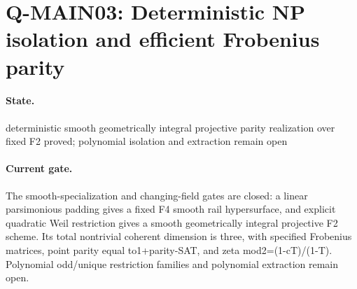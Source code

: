 \section{Q-MAIN03: Deterministic NP isolation and efficient Frobenius parity}
\paragraph{State.} deterministic smooth geometrically integral projective parity realization over fixed F2 proved; polynomial isolation and extraction remain open
\paragraph{Current gate.} The smooth-specialization and changing-field gates are closed: a linear parsimonious padding gives a fixed F4 smooth rail hypersurface, and explicit quadratic Weil restriction gives a smooth geometrically integral projective F2 scheme. Its total nontrivial coherent dimension is three, with specified Frobenius matrices, point parity equal to1+parity-SAT, and zeta mod2=(1-cT)/(1-T). Polynomial odd/unique restriction families and polynomial extraction remain open.
